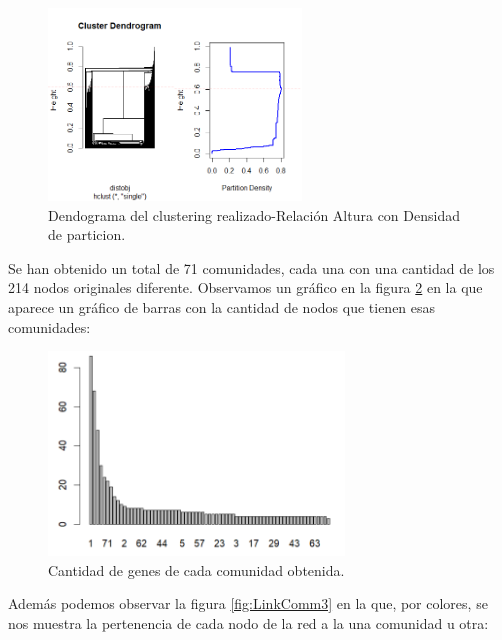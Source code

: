 \begin{figure}[h]
	\centering
	\includegraphics[width=0.60\textwidth]{figures/Grapichs_LinkComm.png}
	\caption{Dendograma del clustering realizado-Relación Altura con Densidad de particion. }
	\label{fig:LinkComm1}
\end{figure}

\newpage

\hfill

Se han obtenido un total de 71 comunidades, cada una con una cantidad de los 214 nodos originales diferente. Observamos un gráfico en la figura \ref{fig:LinkComm2} en la que aparece un gráfico de barras con la cantidad de nodos que tienen esas comunidades:

\begin{figure}[h]
	\centering
	\includegraphics[width=0.70\textwidth]{figures/barplot_communities.PNG}
	\caption{Cantidad de genes de cada comunidad obtenida.}
	\label{fig:LinkComm2}
\end{figure}


Además podemos observar la figura \ref{fig:LinkComm3} en la que, por colores, se nos muestra la pertenencia de cada nodo de la red a la una comunidad u otra:

